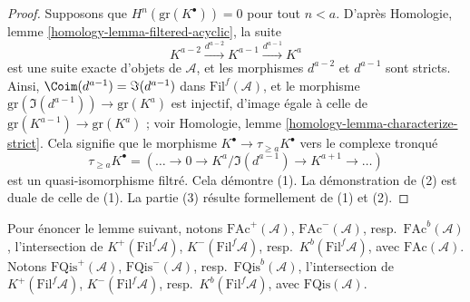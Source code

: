 \begin{proof}
Supposons que $H^n(\text{gr}(K^\bullet)) = 0$ pour tout $n < a$. D'après
Homologie, lemme \ref{homology-lemma-filtered-acyclic}, la suite
$$
K^{a - 2} \xrightarrow{d^{a - 2}} K^{a - 1} \xrightarrow{d^{a - 1}} K^a
$$
est une suite exacte d'objets de $\mathcal{A}$, et les morphismes
$d^{a - 2}$ et $d^{a - 1}$ sont stricts. Ainsi,
$\Coim(d^{a - 1}) = \Im(d^{a - 1})$ dans $\text{Fil}^f(\mathcal{A})$, et le
morphisme $\text{gr}(\Im(d^{a - 1})) \to \text{gr}(K^a)$ est injectif,
d'image égale à celle de
$\text{gr}(K^{a - 1}) \to \text{gr}(K^a)$ ; voir Homologie, lemme
\ref{homology-lemma-characterize-strict}. Cela signifie que le morphisme
$K^\bullet \to \tau_{\geq a}K^\bullet$ vers le complexe tronqué
$$
\tau_{\geq a}K^\bullet =
(\ldots \to 0 \to K^a/\Im(d^{a - 1}) \to K^{a + 1} \to \ldots)
$$
est un quasi-isomorphisme filtré. Cela démontre (1). La démonstration de (2)
est duale de celle de (1). La partie (3) résulte formellement de (1) et (2).
\end{proof}

\noindent
Pour énoncer le lemme suivant, notons
$\text{FAc}^{+}(\mathcal{A})$, $\text{FAc}^{-}(\mathcal{A})$, resp.\
$\text{FAc}^b(\mathcal{A})$, l'intersection de
$K^{+}(\text{Fil}^f\mathcal{A})$, $K^{-}(\text{Fil}^f\mathcal{A})$, resp.\
$K^b(\text{Fil}^f\mathcal{A})$, avec $\text{FAc}(\mathcal{A})$. Notons
$\text{FQis}^{+}(\mathcal{A})$, $\text{FQis}^{-}(\mathcal{A})$, resp.\
$\text{FQis}^b(\mathcal{A})$, l'intersection de
$K^{+}(\text{Fil}^f\mathcal{A})$, $K^{-}(\text{Fil}^f\mathcal{A})$, resp.\
$K^b(\text{Fil}^f\mathcal{A})$, avec $\text{FQis}(\mathcal{A})$.


